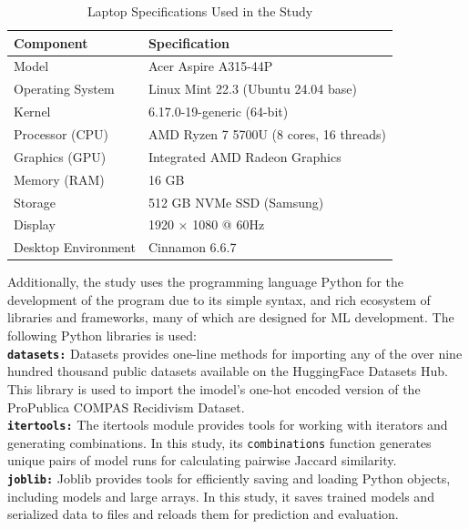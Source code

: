 \documentclass[12pt]{article}
\begin{document}
\begin{table}[ht]
  \centering
  \caption{Laptop Specifications Used in the Study}
  \begin{tabular}{ll}
    \toprule
    \textbf{Component} & \textbf{Specification} \\
    \midrule
    Model & Acer Aspire A315-44P \\
    Operating System & Linux Mint 22.3 (Ubuntu 24.04 base) \\
    Kernel & 6.17.0-19-generic (64-bit) \\
    Processor (CPU) & AMD Ryzen 7 5700U (8 cores, 16 threads) \\
    Graphics (GPU) & Integrated AMD Radeon Graphics \\
    Memory (RAM) & 16 GB \\
    Storage & 512 GB NVMe SSD (Samsung) \\
    Display & 1920 $\times$ 1080 @ 60Hz \\
    Desktop Environment & Cinnamon 6.6.7 \\
    \bottomrule
  \end{tabular}\label{tab:laptop_specs}
\end{table}

Additionally, the study uses the programming language Python for the development of the program due to its simple syntax, and rich ecosystem of libraries and frameworks, many of which are designed for ML development. The following Python libraries is used: \\

\textbf{\texttt{datasets:}} Datasets provides one-line methods for importing any of the over nine hundred thousand public datasets available on the HuggingFace Datasets Hub. This library is used to import the imodel's one-hot encoded version of the ProPublica COMPAS Recidivism Dataset.\\

\textbf{\texttt{itertools:}} The itertools module provides tools for working with iterators and generating combinations. In this study, its \texttt{combinations} function generates unique pairs of model runs for calculating pairwise Jaccard similarity.\\

\textbf{\texttt{joblib:}} Joblib provides tools for efficiently saving and loading Python objects, including models and large arrays. In this study, it saves trained models and serialized data to files and reloads them for prediction and evaluation.\\
\end{document}
